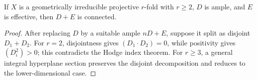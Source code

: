 \begin{corollary}\label{kps-cor-connected-divisors}
If $X$ is a geometrically irreducible projective $r$-fold with $r\ge2$, $D$
is ample, and $E$ is effective, then $D+E$ is connected.
\end{corollary}
\begin{proof}
After replacing $D$ by a suitable ample $nD+E$, suppose it split as disjoint
$D_1+D_2$. For $r=2$, disjointness gives $(D_1\cdot D_2)=0$, while positivity
gives $(D_i^2)>0$; this contradicts the Hodge index theorem. For $r\ge3$, a
general integral hyperplane section preserves the disjoint decomposition and
reduces to the lower-dimensional case.
\end{proof}

